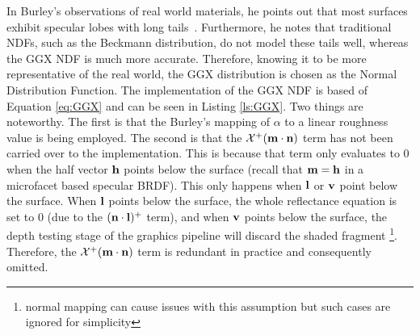 
In Burley's observations of real world materials, he points out that most surfaces exhibit specular lobes with long tails~\cite{Burley2012Physically}. Furthermore, he notes that traditional NDFs, such as the Beckmann distribution, do not model these tails well, whereas the GGX NDF is much more accurate. Therefore, knowing it to be more representative of the real world, the GGX distribution is chosen as the Normal Distribution Function. The implementation of the GGX NDF is based of Equation \ref{eq:GGX} and can be seen in Listing \ref{ls:GGX}. Two things are noteworthy. The first is that the Burley's mapping of \begin{math}\alpha\end{math} to a linear roughness value is being employed. The second is that the \begin{math}\mathcal{X}^+(\mathbf{m}\cdot\mathbf{n})\end{math} term has not been carried over to the implementation. This is because that term only evaluates to 0 when the half vector \begin{math}\mathbf{h}\end{math} points below the surface (recall that \begin{math}\mathbf{m} = \mathbf{h}\end{math} in a microfacet based specular BRDF). This only happens when \begin{math}\mathbf{l}\end{math} or \begin{math}\mathbf{v}\end{math} point below the surface. When \begin{math}\mathbf{l}\end{math} points below the surface, the whole reflectance equation is set to 0 (due to the \begin{math}(\mathbf{n}\cdot\mathbf{l})^+\end{math} term), and when \begin{math}\mathbf{v}\end{math} points below the surface, the depth testing stage of the graphics pipeline will discard the shaded fragment \footnote{normal mapping can cause issues with this assumption but such cases are ignored for simplicity}. Therefore, the \begin{math}\mathcal{X}^+(\mathbf{m}\cdot\mathbf{n})\end{math} term is redundant in practice and consequently omitted.

